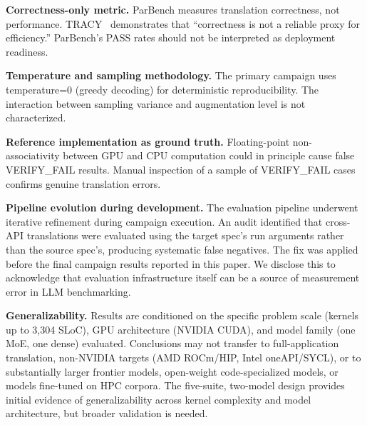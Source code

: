 \documentclass{article}
\newcommand{\verifyfail}{\textsc{VERIFY\_FAIL}}
\begin{document}
\textbf{Correctness-only metric.} ParBench measures translation correctness, not performance. TRACY~\cite{TRACY2025} demonstrates that ``correctness is not a reliable proxy for efficiency.'' ParBench's PASS rates should not be interpreted as deployment readiness.

\textbf{Temperature and sampling methodology.} The primary campaign uses temperature=0 (greedy decoding) for deterministic reproducibility. The interaction between sampling variance and augmentation level is not characterized.

\textbf{Reference implementation as ground truth.} Floating-point non-associativity between GPU and CPU computation could in principle cause false \verifyfail{} results. Manual inspection of a sample of \verifyfail{}{} cases confirms genuine translation errors.

\textbf{Pipeline evolution during development.} The evaluation pipeline underwent iterative refinement during campaign execution. An audit identified that cross-API translations were evaluated using the target spec's run arguments rather than the source spec's, producing systematic false negatives. The fix was applied before the final campaign results reported in this paper. We disclose this to acknowledge that evaluation infrastructure itself can be a source of measurement error in LLM benchmarking.

\textbf{Generalizability.} Results are conditioned on the specific problem scale (kernels up to 3,304 SLoC), GPU architecture (NVIDIA CUDA), and model family (one MoE, one dense) evaluated. Conclusions may not transfer to full-application translation, non-NVIDIA targets (AMD ROCm/HIP, Intel oneAPI/SYCL), or to substantially larger frontier models, open-weight code-specialized models, or models fine-tuned on HPC corpora. The five-suite, two-model design provides initial evidence of generalizability across kernel complexity and model architecture, but broader validation is needed.

\end{document}
